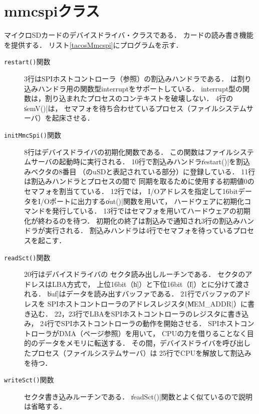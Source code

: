 \section{mmcspiクラス}
\label{tacosLbaDriver}
マイクロSDカードのデバイスドライバ・クラスである．
カードの読み書き機能を提供する．
リスト\ref{tacosMmcspi}にプログラムを示す．

  

\begin{description}
\item[\texttt{restart()}関数]
  3行はSPIホストコントローラ（参照）の割込みハンドラである．
  {\cmml}は割り込みハンドラ用の関数型interruptをサポートしている．
  interrupt型の関数は，割り込まれたプロセスのコンテキストを破壊しない．
  4行の\|semV()|は，
  セマフォを待ち合わせているプロセス（ファイルシステムサーバ）を起床させる．
\item[\texttt{initMmcSpi()}関数]
  8行はデバイスドライバの初期化関数である．
  この関数はファイルシステムサーバの起動時に実行される．
  10行で割込みハンドラ\|restart()|を割込みベクタの8番目
  （のuSDと表記されている部分）に登録している．
  11行は割込みハンドラとプロセスの間で
  同期を取るために使用する初期値0のセマフォを割当てている．
  12行では，
  I/Oアドレスを指定して16bitデータをI/Oポートに出力する\|out()|関数を用いて，
  ハードウェアに初期化コマンドを発行している．
  13行ではセマフォを用いてハードウェアの初期化が終わるのを待つ．
  初期化の終了は割込みで通知され3行の割込みハンドラが実行される．
  割込みハンドラは4行でセマフォを待っているプロセスを起こす．
\item[\texttt{readSct()}関数]
  20行はデバイスドライバの
  セクタ読み出しルーチンである．
  セクタのアドレスはLBA方式で，
  上位16bit（\|h|）と下位16bit（\|l|）とに分けて渡される．
  \|buf|はデータを読み出すバッファである．
  21行でバッファのアドレスを
  SPIホストコントローラのアドレスレジスタ(\|MEM_ADDR|）に書き込む．
  22，23行でLBAをSPIホストコントローラのレジスタに書き込み，
  24行でSPIホストコントローラの動作を開始させる．
  SPIホストコントローラがDMA（\pageref{dma}ページ参照）を用いて，
  CPUの力を借りることなく目的のデータをメモリに転送する．
  その間，デバイスドライバを呼び出したプロセス（ファイルシステムサーバ）は
  25行でCPUを解放して割込みを待つ．
\item[\texttt{writeSct()}関数]
  セクタ書き込みルーチンである．
  \|readSct()|関数とよく似ているので説明は省略する．
\end{description}

